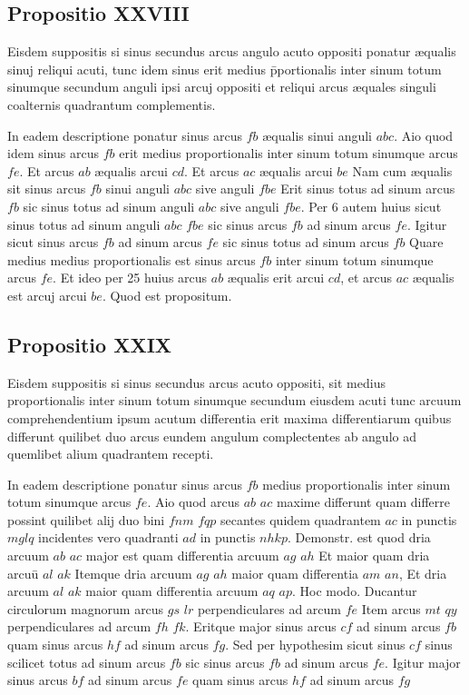 \documentclass[11pt,a4paper]{article}
\begin{document}
\subsection*{Propositio XXVIII}

Eisdem suppositis si sinus secundus arcus angulo acuto oppositi ponatur æqualis sinuj reliqui acuti, tunc idem sinus erit medius p̄portionalis inter sinum totum sinumque secundum anguli ipsi arcuj oppositi et reliqui arcus æquales singuli coalternis quadrantum complementis.

In eadem descriptione ponatur sinus arcus $fb$ æqualis sinui anguli $abc$. Aio quod idem sinus arcus $fb$ erit medius proportionalis inter sinum totum sinumque arcus $fe$. Et arcus $ab$ æqualis arcui $cd$. Et arcus $ac$ æqualis arcui $be$ Nam cum æqualis sit sinus arcus $fb$ sinui anguli $abc$ sive anguli $fbe$ Erit sinus totus ad sinum arcus $fb$ sic sinus totus ad sinum anguli $abc$ sive anguli $fbe$. Per 6 autem huius sicut sinus totus ad sinum anguli $abc$  $fbe$ sic sinus arcus $fb$ ad sinum arcus $fe$. Igitur sicut sinus arcus $fb$ ad sinum arcus $fe$ sic sinus totus ad sinum arcus $fb$ Quare medius medius proportionalis est sinus arcus $fb$ inter sinum totum sinumque arcus $fe$. Et ideo per 25 huius arcus $ab$ æqualis erit arcui $cd$, et arcus $ac$ æqualis est arcuj arcui $be$. Quod est propositum.

\subsection*{Propositio XXIX}

Eisdem suppositis si sinus secundus arcus acuto oppositi, sit medius proportionalis inter sinum totum sinumque secundum eiusdem acuti tunc arcuum comprehendentium ipsum acutum differentia erit maxima differentiarum quibus differunt quilibet duo arcus eundem angulum complectentes ab angulo ad quemlibet alium quadrantem recepti.

In eadem descriptione ponatur sinus arcus $fb$ medius proportionalis inter sinum totum sinumque arcus $fe$. Aio quod  arcus $ab$ $ac$ maxime differunt quam differre possint quilibet alij duo bini  $fnm$ $fqp$ secantes quidem quadrantem $ac$ in punctis $mglq$ incidentes vero quadranti $ad$ in punctis $nhkp$. Demonstr. est quod dria arcuum $ab$ $ac$ major est quam differentia arcuum $ag$ $ah$ Et maior quam dria arcuū $al$ $ak$ Itemque dria arcuum $ag$ $ah$ maior quam differentia $am$ $an$, Et dria arcuum $al$ $ak$ maior quam differentia arcuum $aq$ $ap$. Hoc modo. Ducantur circulorum magnorum arcus $gs$ $lr$ perpendiculares ad arcum $fe$ Item arcus $mt$ $qy$ perpendiculares ad arcum $fh$ $fk$. Eritque major sinus arcus $cf$ ad sinum arcus $fb$ quam sinus arcus $hf$ ad sinum arcus $fg$. Sed per hypothesim sicut sinus $cf$ sinus scilicet totus ad sinum arcus $fb$ sic sinus arcus $fb$ ad sinum arcus $fe$. Igitur major sinus arcus $bf$ ad sinum arcus $fe$ quam sinus arcus $hf$ ad sinum arcus $fg$
\end{document}
